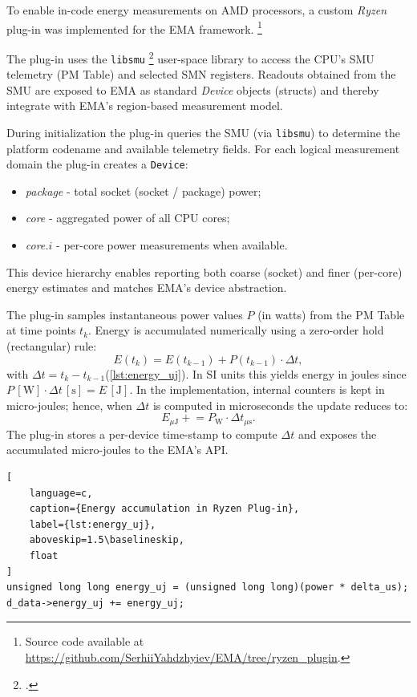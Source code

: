 To enable in-code energy measurements on AMD processors, a custom
\textit{Ryzen} plug-in was implemented for the \gls{EMA} framework.
\footnote{Source code available at
\url{https://github.com/SerhiiYahdzhyiev/EMA/tree/ryzen_plugin}.}

The plug-in uses the \texttt{libsmu} \footcite{RyzenSMU_GitHub} user-space
library to access the \gls{CPU}'s \gls{SMU} telemetry (\gls{PM} Table) and
selected \gls{SMN} registers. Readouts obtained
from the \gls{SMU} are exposed to \gls{EMA} as standard \emph{Device}
objects (structs) and thereby integrate with \gls{EMA}'s region-based
measurement model.

During initialization the plug-in queries the \gls{SMU} (via \texttt{libsmu})
to determine the platform codename and available telemetry fields. For
each logical measurement domain the plug-in creates a \texttt{Device}:
\begin{itemize}
  \item \emph{package} - total socket (socket / package) power;
  \item \emph{core} - aggregated power of all CPU cores;
  \item \emph{core.\(i\)} - per-core power measurements when available.
\end{itemize}
This device hierarchy enables reporting both coarse (socket) and finer
(per-core) energy estimates and matches \gls{EMA}'s device abstraction.

The plug-in samples instantaneous power values \(P\) (in watts) from the
\gls{PM} Table at time points \(t_k\). Energy is accumulated numerically
using a zero-order hold (rectangular) rule:
\[
  E(t_k) = E(t_{k-1}) + P(t_{k-1}) \cdot \Delta t,
\]
with \(\Delta t = t_k - t_{k-1}\)(\cref{lst:energy_uj}). In SI units this
yields energy in joules since
\(P\,[\mathrm{W}]\cdot\Delta t\,[\mathrm{s}] = E\,[\mathrm{J}]\).
In the implementation, internal counters is kept in micro-joules; hence,
when \(\Delta t\) is computed in microseconds the update reduces to:
\[
  E_{\mu\mathrm{J}} \mathrel{+}= P_{\mathrm{W}} \cdot \Delta t_{\mu\mathrm{s}}.
\]
The plug-in stores a per-device time-stamp to compute \(\Delta t\) and
exposes the accumulated micro-joules to the \gls{EMA}'s API.

\begin{samepage}
\begin{lstlisting}[
    language=c,
    caption={Energy accumulation in Ryzen Plug-in},
    label={lst:energy_uj},
    aboveskip=1.5\baselineskip,
    float
]
unsigned long long energy_uj = (unsigned long long)(power * delta_us);
d_data->energy_uj += energy_uj;
\end{lstlisting}
\end{samepage}


